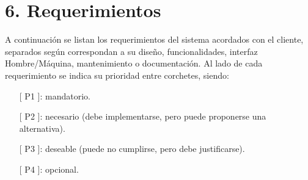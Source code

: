 \documentclass[
11pt, %
codirector, %
]{charter}
\begin{document}
\section{6. Requerimientos}
\label{sec:requerimientos}

A continuación se listan los requerimientos del sistema acordados con el cliente, separados según correspondan a su diseño, funcionalidades, interfaz Hombre/Máquina, mantenimiento o documentación. Al lado de cada requerimiento se indica su prioridad entre corchetes, siendo:
\begin{itemize}
	\item [[ P1]]: mandatorio.
	\item [[ P2]]: necesario (debe implementarse, pero puede proponerse una alternativa).
	\item [[ P3]]: deseable (puede no cumplirse, pero debe justificarse).
	\item [[ P4]]: opcional.
\end{itemize} 
\end{document}

